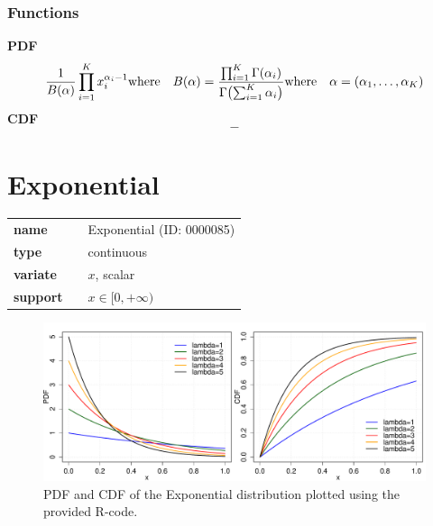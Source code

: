 \subsubsection*{Functions}

\smallskip \noindent \hspace{.2cm} \textbf{PDF} 
\begin{equation*}\frac{1}{B(\alpha)} \prod_{i=1}^K x_i^{\alpha_i - 1} \\ \text{where} \quad B(\alpha) = \frac{\prod_{i=1}^K \Gamma(\alpha_i)}{\Gamma\bigl(\sum_{i=1}^K \alpha_i\bigr)} \\ \text{where} \quad \alpha=(\alpha_1,\ldots,\alpha_K)\end{equation*}
\smallskip \noindent \hspace{.2cm} \textbf{CDF} 
\begin{equation*}-\end{equation*}
\smallskip\section*{Exponential} 

  \bigskip 

\begin{tabular}{p{2cm}cl}
\textbf{name} & & Exponential (ID: 0000085)\\ 
 
\textbf{type} & & continuous \\ 

\textbf{variate} & & $x$, scalar \\ 

\textbf{support} & & $x \in [0,+\infty)$
\end{tabular}


\begin{figure}[ht!]
\centering
  \includegraphics[width=140mm]{pics/Exponential_pdf_cdf.pdf}
 \caption{PDF and CDF of the Exponential distribution plotted using the provided R-code.}
 \label{fig:Exponential_pdf_cdf}
\end{figure}

